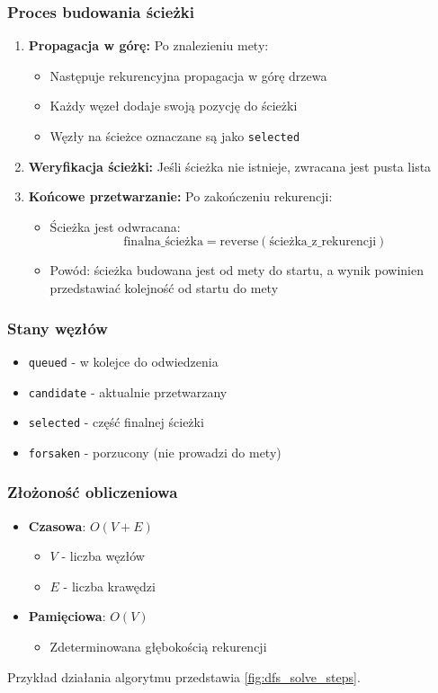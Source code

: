 \documentclass[../../../../doc.tex]{subfiles}
\begin{document}
\subsubsection{Proces budowania ścieżki}
\begin{enumerate}
  \item \textbf{Propagacja w górę:} Po znalezieniu mety:
        \begin{itemize}
          \item Następuje rekurencyjna propagacja w górę drzewa
          \item Każdy węzeł dodaje swoją pozycję do ścieżki
          \item Węzły na ścieżce oznaczane są jako \texttt{selected}
        \end{itemize}
  \item \textbf{Weryfikacja ścieżki:} Jeśli ścieżka nie istnieje, zwracana jest pusta lista
  \item \textbf{Końcowe przetwarzanie:} Po zakończeniu rekurencji:
        \begin{itemize}
          \item Ścieżka jest odwracana:
                \[ \text{finalna\_ścieżka} = \mathrm{reverse}(\text{ścieżka\_z\_rekurencji}) \]
          \item Powód: ścieżka budowana jest od mety do startu, a wynik powinien przedstawiać kolejność od startu do mety
        \end{itemize}
\end{enumerate}

\subsubsection{Stany węzłów}
\begin{itemize}
  \item \texttt{queued} - w kolejce do odwiedzenia
  \item \texttt{candidate} - aktualnie przetwarzany
  \item \texttt{selected} - część finalnej ścieżki
  \item \texttt{forsaken} - porzucony (nie prowadzi do mety)
\end{itemize}

\subsubsection{Złożoność obliczeniowa}
\begin{itemize}
  \item \textbf{Czasowa}: $O(V + E)$
        \begin{itemize}
          \item $V$ - liczba węzłów
          \item $E$ - liczba krawędzi
        \end{itemize}
  \item \textbf{Pamięciowa}: $O(V)$
        \begin{itemize}
          \item Zdeterminowana głębokością rekurencji
        \end{itemize}
\end{itemize}

Przykład działania algorytmu przedstawia \cref{fig:dfs_solve_steps}.


\end{document}
